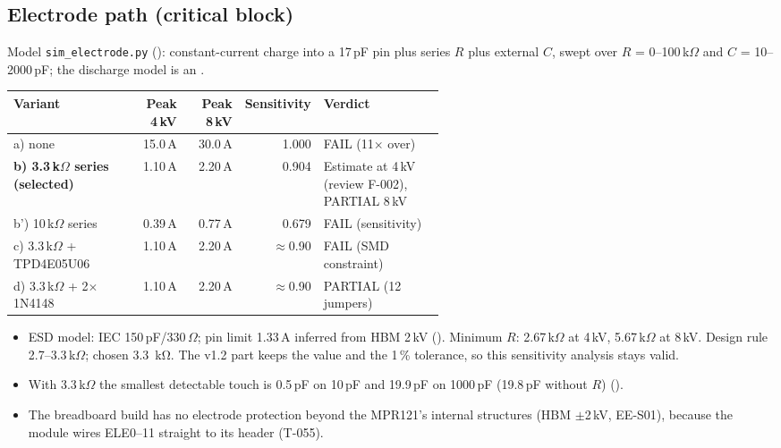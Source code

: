\subsection{Electrode path (critical block)}
Model \nolinkurl{sim_electrode.py} (): constant-current charge into
a 17\,pF pin plus series $R$ plus external $C$, swept over $R$ = 0--100\,k$\Omega$
and $C$ = 10--2000\,pF; the discharge model is an 
.

\begin{longtable}{@{}>{\raggedright\arraybackslash}p{0.28\linewidth}rrr>{\raggedright\arraybackslash}p{0.28\linewidth}@{}}
\toprule
Variant & Peak 4\,kV & Peak 8\,kV & Sensitivity & Verdict \\
\midrule\endhead
a) none & 15.0\,A & 30.0\,A & 1.000 & FAIL (11$\times$ over) \\
\textbf{b) 3.3\,k$\Omega$ series (selected)} & 1.10\,A & 2.20\,A & 0.904 & Estimate at 4\,kV (review F-002), PARTIAL 8\,kV \\
b') 10\,k$\Omega$ series & 0.39\,A & 0.77\,A & 0.679 & FAIL (sensitivity) \\
c) 3.3\,k$\Omega$ + TPD4E05U06 & 1.10\,A & 2.20\,A & $\approx$0.90 & FAIL (SMD constraint) \\
d) 3.3\,k$\Omega$ + 2$\times$1N4148 & 1.10\,A & 2.20\,A & $\approx$0.90 & PARTIAL (12 jumpers) \\
\bottomrule
\end{longtable}
\begin{itemize}[noitemsep]
  \item ESD model: IEC 150\,pF/330\,$\Omega$; pin limit 1.33\,A inferred from HBM
        2\,kV (). Minimum $R$: 2.67\,k$\Omega$ at 4\,kV,
        5.67\,k$\Omega$ at 8\,kV. Design rule 2.7--3.3\,k$\Omega$; chosen
        \qty{3.3}{\kilo\ohm}. The v1.2 part keeps the value and the 1\,\% tolerance,
        so this sensitivity analysis stays valid.
  \item With 3.3\,k$\Omega$ the smallest detectable touch is 0.5\,pF on 10\,pF and
        19.9\,pF on 1000\,pF (19.8\,pF without $R$) ().
  \item The breadboard build has no electrode protection beyond the MPR121's
        internal structures (HBM $\pm$2\,kV,  EE-S01), because the module
        wires ELE0--11 straight to its header (T-055).
\end{itemize}

